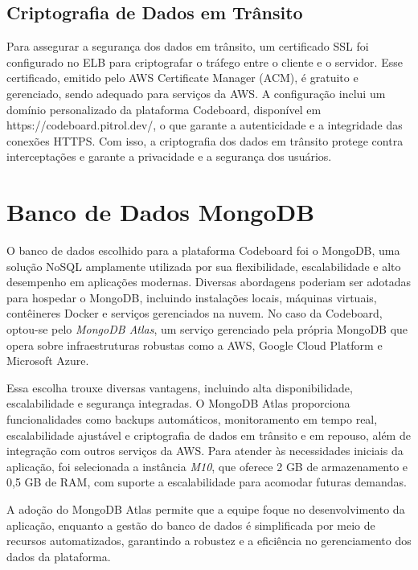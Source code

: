 \subsection{Criptografia de Dados em Trânsito}

Para assegurar a segurança dos dados em trânsito, um certificado SSL foi configurado no ELB para criptografar o tráfego entre o cliente e o servidor. Esse certificado, emitido pelo AWS Certificate Manager (ACM), é gratuito e gerenciado, sendo adequado para serviços da AWS. A configuração inclui um domínio personalizado da plataforma Codeboard, disponível em https://codeboard.pitrol.dev/, o que garante a autenticidade e a integridade das conexões HTTPS. Com isso, a criptografia dos dados em trânsito protege contra interceptações e garante a privacidade e a segurança dos usuários.


\section{Banco de Dados MongoDB}

O banco de dados escolhido para a plataforma Codeboard foi o MongoDB, uma solução NoSQL amplamente utilizada por sua flexibilidade, escalabilidade e alto desempenho em aplicações modernas. Diversas abordagens poderiam ser adotadas para hospedar o MongoDB, incluindo instalações locais, máquinas virtuais, contêineres Docker e serviços gerenciados na nuvem. No caso da Codeboard, optou-se pelo \emph{MongoDB Atlas}, um serviço gerenciado pela própria MongoDB que opera sobre infraestruturas robustas como a AWS, Google Cloud Platform e Microsoft Azure.

Essa escolha trouxe diversas vantagens, incluindo alta disponibilidade, escalabilidade e segurança integradas. O MongoDB Atlas proporciona funcionalidades como backups automáticos, monitoramento em tempo real, escalabilidade ajustável e criptografia de dados em trânsito e em repouso, além de integração com outros serviços da AWS. Para atender às necessidades iniciais da aplicação, foi selecionada a instância \emph{M10}, que oferece 2 GB de armazenamento e 0,5 GB de RAM, com suporte a escalabilidade para acomodar futuras demandas.

A adoção do MongoDB Atlas permite que a equipe foque no desenvolvimento da aplicação, enquanto a gestão do banco de dados é simplificada por meio de recursos automatizados, garantindo a robustez e a eficiência no gerenciamento dos dados da plataforma.


